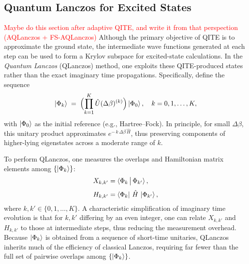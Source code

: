 \documentclass[aip,jcp,amsmath,amssymb, reprint]{revtex4-1}
\begin{document}
\subsection{Quantum Lanczos for Excited States}
\label{sec:qlanczos}

\textcolor{red}{Maybe do this section after adaptive QITE, and write it from that perspection (AQLanczos + FS-AQLanczos)}
Although the primary objective of QITE is to approximate the ground state, the intermediate wave functions generated at each step can be used to form a Krylov subspace for excited-state calculations. In the \textit{Quantum Lanczos} (QLanczos) method,\cite{motta2019determining} one exploits these QITE-produced states rather than the exact imaginary time propagations. Specifically, define the sequence
\begin{equation}
\ket{\Phi_k} 
\;=\; 
\Bigl(\prod_{k=1}^{K} \hat{U}(\Delta \beta)^{(k)}\Bigr)
\ket{\Phi_0},
\quad 
k = 0,1,\ldots,K,
\end{equation}
with $\ket{\Phi_0}$ as the initial reference (e.g., Hartree--Fock). 
In principle, for small $\Delta \beta$, this unitary product approximates $e^{-\,k\,\Delta \beta\,\hat{H}}$, thus preserving components of higher-lying eigenstates across a moderate range of $k$.

To perform QLanczos, one measures the overlaps and Hamiltonian matrix elements among $\{\ket{\Phi_k}\}$:
\begin{align}
X_{k,k'} 
&= 
\braket{\Phi_k 
\,\big|\,
\Phi_{k'}},
\label{eq:Xkk}
\\[3pt]
H_{k,k'} 
&= 
\bra{\Phi_k}\,
\hat{H}\,
\ket{\Phi_{k'}},
\label{eq:Hkk}
\end{align}
where $k,k' \in \{0,1,\ldots,K\}$. 
A characteristic simplification of imaginary time evolution is that for $k,k'$ differing by an even integer, one can relate $X_{k,k'}$ and $H_{k,k'}$ to those at intermediate steps, thus reducing the measurement overhead. 
Because $\ket{\Phi_k}$ is obtained from a sequence of short-time unitaries, QLanczos inherits much of the efficiency of classical Lanczos, requiring far fewer than the full set of pairwise overlaps among $\{\ket{\Phi_k}\}$.
\end{document}
